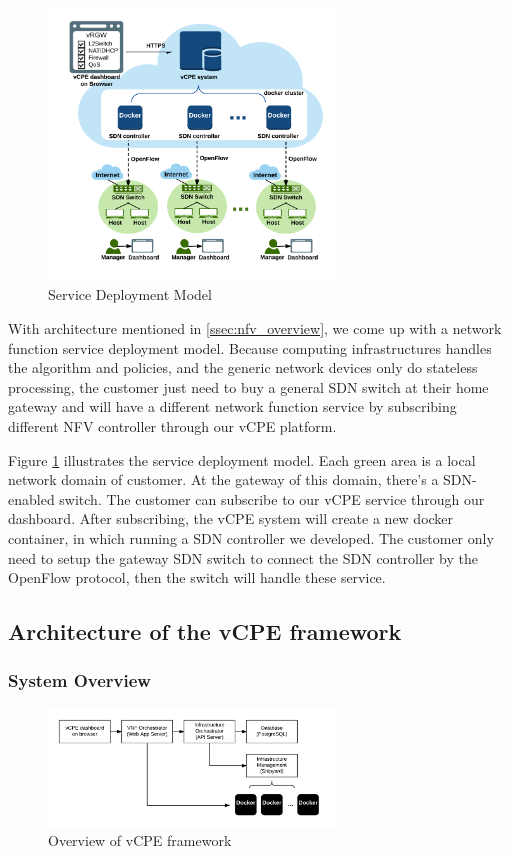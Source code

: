 \documentclass[journal]{IEEEtran}
\begin{document}
\begin{figure}[!t]
\centering
\includegraphics[width=3in]{./figures/deployment}
\caption{Service Deployment Model}
\label{fig:vcpe_deploy}
\end{figure}

With architecture mentioned in \ref{ssec:nfv_overview}, we come up with a network function service deployment model. Because computing infrastructures handles the algorithm and policies, and the generic network devices only do stateless processing, the customer just need to buy a general SDN switch at their home gateway and will have a different network function service by subscribing different NFV controller through our vCPE platform.

Figure \ref{fig:vcpe_deploy} illustrates the service deployment model. Each green area is a local network domain of customer. At the gateway of this domain, there’s a SDN-enabled switch. The customer can subscribe to our vCPE service through our dashboard. After subscribing, the vCPE system will create a new docker container, in which running a SDN controller we developed. The customer only need to setup the gateway SDN switch to connect the SDN controller by the OpenFlow protocol, then the switch will handle these service.

\subsection{Architecture of the vCPE framework}
\subsubsection{System Overview}

\begin{figure}[!t]
\centering
\includegraphics[width=3in]{./figures/vcpe_framework_overview}
\caption{Overview of vCPE framework}
\label{fig:vcpe_framework}
\end{figure}
\end{document}
